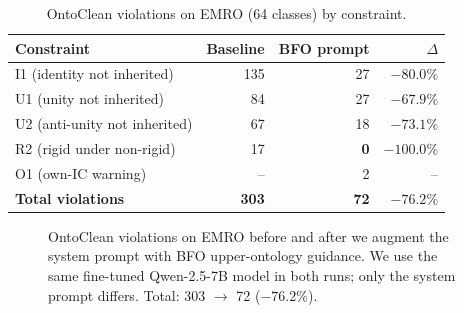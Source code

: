 \documentclass[10pt,a4paper]{article}
\begin{document}
\begin{table}[h]
\centering
\small
\caption{OntoClean violations on EMRO (64 classes) by constraint.}
\label{tab:headline}
\begin{tabular}{lrrr}
\toprule
Constraint & Baseline & BFO prompt & $\Delta$ \\
\midrule
I1 (identity not inherited)      & 135 & 27  & $-80.0\%$ \\
U1 (unity not inherited)         & 84  & 27  & $-67.9\%$ \\
U2 (anti-unity not inherited)    & 67  & 18  & $-73.1\%$ \\
R2 (rigid under non-rigid)       & 17  & \textbf{0} & $\mathbf{-100.0\%}$ \\
O1 (own-IC warning)              & --  & 2   & --      \\
\midrule
\textbf{Total violations}        & \textbf{303} & \textbf{72}  & $\mathbf{-76.2\%}$ \\
\bottomrule
\end{tabular}
\end{table}

\begin{figure}[h]
\centering
{}
\caption{OntoClean violations on EMRO before and after we augment the
system prompt with BFO upper-ontology guidance. We use the same
fine-tuned Qwen-2.5-7B model in both runs; only the system prompt
differs. Total: 303 $\rightarrow$ 72 ($-76.2\%$).}
\label{fig:violations}
\end{figure}
\end{document}

